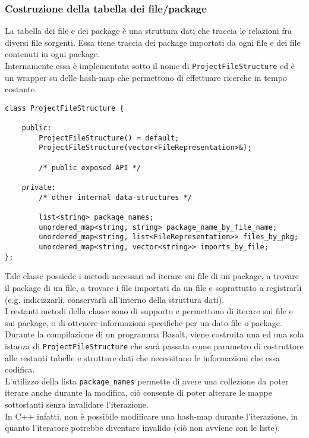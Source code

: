 
\subsubsection{Costruzione della tabella dei file/package}
La tabella dei file e dei package è una struttura dati che traccia le relazioni fra 
diversi file sorgenti. Essa tiene traccia dei package importati da ogni file e dei file 
contenuti in ogni package. \\

Internamente essa è implementata sotto il nome di \texttt{ProjectFileStructure} 
ed è un wrapper su delle hash-map che permettono di
effettuare ricerche in tempo costante. \\

\vspace{0.5cm}
\begin{lstlisting}[frame=single]
class ProjectFileStructure {

    public:
        ProjectFileStructure() = default;
        ProjectFileStructure(vector<FileRepresentation>&);

        /* public exposed API */

    private:
        /* other internal data-structures */ 
        
        list<string> package_names;
        unordered_map<string, string> package_name_by_file_name;
        unordered_map<string, list<FileRepresentation>> files_by_pkg;
        unordered_map<string, vector<string>> imports_by_file;
};
\end{lstlisting}
\vspace{0.5cm}

Tale classe possiede i metodi necessari ad iterare sui file di un package, a trovare
il package di un file, a trovare i file importati da un file e soprattutto a 
registrarli (e.g. indicizzarli, conservarli all'interno della struttura dati). \\

I restanti metodi della classe sono di supporto e permettono di iterare sui file e 
sui package, o di ottenere informazioni specifiche per un dato file o package. \\

Durante la compilazione di un programma Basalt, viene costruita una ed una sola 
istanza di \texttt{ProjectFileStructure} che sarà passata come parametro di costruttore 
alle restanti tabelle e strutture dati che necessitano le informazioni che essa codifica. \\

L'utilizzo della lista \texttt{package\_names} permette di avere una collezione da poter iterare 
anche durante la modifica, ciò consente di poter alterare le mappe sottostanti senza invalidare 
l'iterazione. \\

In C++ infatti, non è possibile modificare una hash-map durante l'iterazione, in quanto 
l'iteratore potrebbe diventare invalido (ciò non avviene con le liste).